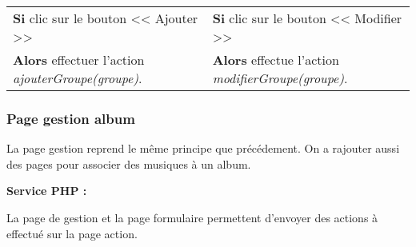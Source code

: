             \begin{center}
                \begin{tabular}{l | l}
                    \textbf{Si} clic sur le bouton << Ajouter >> & \textbf{Si} clic sur le bouton << Modifier >> \\
                    \textbf{Alors} effectuer l'action \emph{ajouterGroupe(groupe)}. & \textbf{Alors} effectue l'action \emph{modifierGroupe(groupe)}.
                \end{tabular}
            \end{center}
            
			
            
    \newpage

		\subsubsection{Page gestion album}

			\begin{paragraphe}
                La page gestion reprend le même principe que précédement. On a rajouter aussi des pages pour associer des musiques à un album.
			\end{paragraphe}

			\begin{paragraphe}
				\textbf{Service PHP :}
			\end{paragraphe}
            
            \begin{paragraphe}
                La page de gestion et la page formulaire permettent d'envoyer des actions à effectué sur la page action.
			\end{paragraphe}

